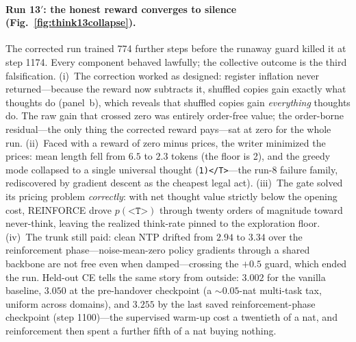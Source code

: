 \documentclass{article} %
\newcommand{\tstart}{\texttt{<T>}}
\newcommand{\tend}{\texttt{</T>}}
\begin{document}
\paragraph{Run 13$'$: the honest reward converges to silence (Fig.~\ref{fig:think13collapse}).} The corrected run trained 774 further steps before the runaway guard killed it at step 1174. Every component behaved lawfully; the collective outcome is the third falsification. (i)~The correction worked as designed: register inflation never returned---because the reward now subtracts it, shuffled copies gain exactly what thoughts do (panel~b), which reveals that shuffled copies gain \emph{everything} thoughts do. The raw gain that crossed zero was entirely order-free value; the order-borne residual---the only thing the corrected reward pays---sat at zero for the whole run. (ii)~Faced with a reward of zero minus prices, the writer minimized the prices: mean length fell from $6.5$ to $2.3$ tokens (the floor is 2), and the greedy mode collapsed to a single universal thought (\texttt{1)}\tend---the run-8 failure family, rediscovered by gradient descent as the cheapest legal act). (iii)~The gate solved its pricing problem \emph{correctly}: with net thought value strictly below the opening cost, REINFORCE drove $p(\tstart)$ through twenty orders of magnitude toward never-think, leaving the realized think-rate pinned to the exploration floor. (iv)~The trunk still paid: clean NTP drifted from $2.94$ to $3.34$ over the reinforcement phase---noise-mean-zero policy gradients through a shared backbone are not free even when damped---crossing the $+0.5$ guard, which ended the run. Held-out CE tells the same story from outside: $3.002$ for the vanilla baseline, $3.050$ at the pre-handover checkpoint (a ${\sim}0.05$-nat multi-task tax, uniform across domains), and $3.255$ by the last saved reinforcement-phase checkpoint (step 1100)---the supervised warm-up cost a twentieth of a nat, and reinforcement then spent a further fifth of a nat buying nothing.
\end{document}
